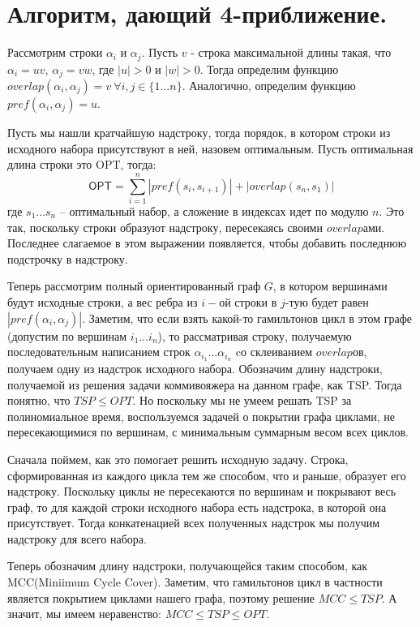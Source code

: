 \documentclass{article}
\begin{document}
\section*{Алгоритм, дающий 4-приближение.}
Рассмотрим строки $\alpha_i$ и $\alpha_j$. Пусть $v$ - строка максимальной длины такая, что $\alpha_i = uv$, $\alpha_j=vw$, где $|u|>0$ и $|w|>0$. Тогда определим функцию $overlap(\alpha_i,\alpha_j)=v \ \forall i,j \in \{1 \ldots n\}$. Аналогично, определим функцию $pref(\alpha_i,\alpha_j)=u$.

Пусть мы нашли кратчайшую надстроку, тогда порядок, в котором строки из исходного набора присутствуют в ней, назовем оптимальным. Пусть оптимальная длина строки это \textsf{OPT}, тогда:
$$\textsf{OPT} = \sum_{i=1}^{n}|pref(s_i,s_{i+1})| + |overlap(s_n,s_1)|$$ где $s_1\ldots s_n$ -- оптимальный набор, а сложение в индексах идет по модулю $n$. Это так, поскольку строки образуют надстроку, пересекаясь своими $overlap$ами. Последнее слагаемое в этом выражении появляется, чтобы добавить последнюю подстрочку в надстроку.

Теперь рассмотрим полный ориентированный граф $G$, в котором вершинами будут исходные строки, а вес ребра из $i-$ой строки в $j$-тую  будет равен $|pref(\alpha_i,\alpha_j)|$. Заметим, что если взять какой-то гамильтонов цикл в этом графе (допустим по вершинам $i_1 \ldots i_n$), то рассматривая строку, получаемую последовательным написанием строк $\alpha_{i_1} \ldots \alpha_{i_n}$ cо склеиванием $overlap$ов, получаем одну из надстрок исходного набора.
Обозначим длину надстроки, получаемой из решения задачи коммивояжера на данном графе, как TSP. Тогда понятно, что $TSP \leq OPT$. Но поскольку мы не умеем решать TSP за полиномиальное время, воспользуемся задачей о покрытии графа циклами, не пересекающимися по вершинам, с минимальным суммарным весом всех циклов.

Сначала поймем, как это помогает решить исходную задачу. Строка, сформированная из каждого цикла тем же способом, что и раньше, образует его надстроку. Поскольку циклы не пересекаются по вершинам и покрывают весь граф, то 
для каждой строки исходного набора есть надстрока, в которой она присутствует. Тогда конкатенацией всех полученных надстрок мы получим надстроку для всего набора.

Теперь обозначим длину надстроки, получающейся таким способом, как \textsf{MCC}(Miniimum Cycle Cover).
Заметим, что гамильтонов цикл в частности является покрытием циклами нашего графа, поэтому решение $ MCC \leq TSP$. А значит, мы имеем неравенство: $MCC \leq TSP \leq OPT$.
\end{document}
